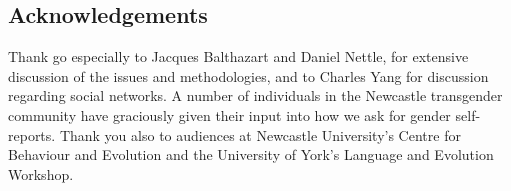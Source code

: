 \documentclass[a0,portrait]{a0poster}
\begin{document}
\begin{multicols}{2}
\section*{Acknowledgements}

Thank go especially to Jacques Balthazart and Daniel Nettle, for extensive discussion of the issues and methodologies, and to Charles Yang for discussion regarding social networks. A number of individuals in the Newcastle transgender community have graciously given their input into how we ask for gender self-reports. Thank you also to audiences at Newcastle University's Centre for Behaviour and Evolution and the University of York's Language and Evolution Workshop.


\end{multicols}
\end{document}
